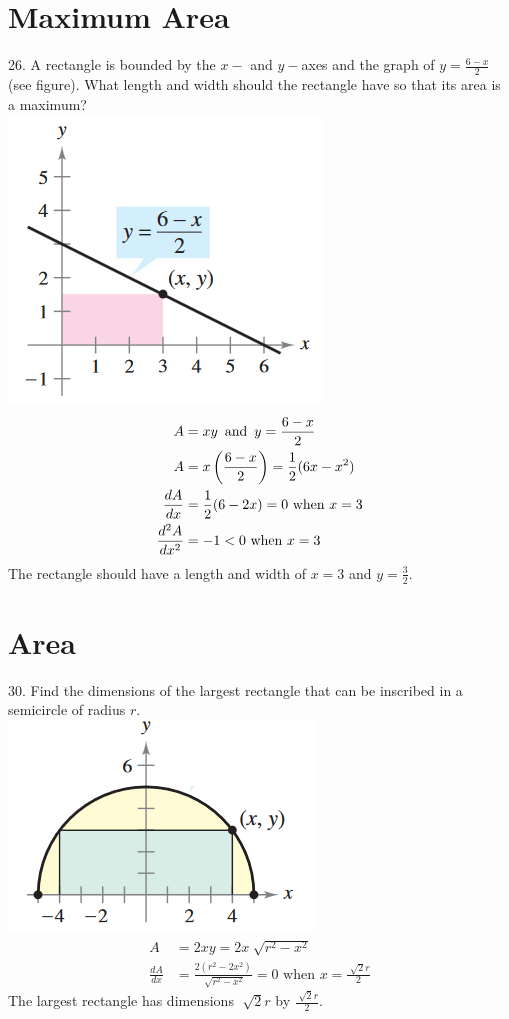 \documentclass[11pt]{article}
\newcommand*{\set}{\setcounter{equation}{0}}
\begin{document}
\section{Maximum Area}
26. A rectangle is bounded by the $x-$ and $y-$axes and the graph of $y=\frac{6-x}{2}$ (see figure). What length and width should the rectangle have so that its area is a maximum?\\
\includegraphics{26.png}\\
\begin{align}
    \set
    A&=xy\,\,\,\text{and}\,\,\, y=\frac{6-x}{2}\\
    A&=x\left(\frac{6-x}{2}\right)=\frac{1}{2}(6x-x^2)\\
    \frac{dA}{dx}&=\frac{1}{2}(6-2x)=0\,\,\text{when}\,\, x=3\\
    \frac{d^2A}{dx^2}&=-1<0\,\,\text{when}\,\, x=3
\end{align}
The rectangle should have a length and width of $x=3$ and $y=\frac{3}{2}$.

\section{Area}
30. Find the dimensions of the largest rectangle that can be inscribed in a semicircle of radius $r$.\\
\includegraphics{30.png}
\begin{align}
    A&=2xy=2x\sqrt[]{r^2-x^2}\\
    \frac{dA}{dx}&=\frac{2(r^2-2x^2)}{\sqrt[]{r^2-x^2}}=0\,\,\text{when}\,\, x=\frac{\sqrt[]{2}r}{2}
\end{align}
The largest rectangle has dimensions $\sqrt[]{2}r$ by $\frac{\sqrt[]{2}r}{2}$.
\end{document}
